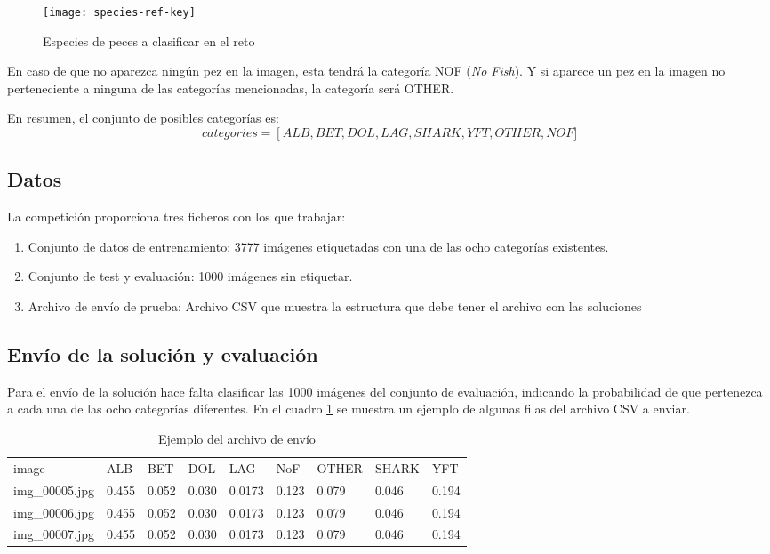 \begin{figure}
  \centering
  \caption{Especies de peces a clasificar en el reto}
\label{kaggle-fishes}
  \texttt{[image: species-ref-key]}
\end{figure}

En caso de que no aparezca ningún pez en la imagen, esta tendrá la categoría NOF (\textit{No Fish}). Y si aparece un pez en la imagen no perteneciente a ninguna de las categorías mencionadas, la categoría será OTHER.

En resumen, el conjunto de posibles categorías es:
\[
  categories =
  \left[ALB, BET, DOL, LAG, SHARK, YFT, OTHER, NOF]
\]

\subsection{Datos}

La competición proporciona tres ficheros con los que trabajar:

\begin{enumerate}
  \item{Conjunto de datos de entrenamiento: 3777 imágenes etiquetadas con una de las ocho categorías existentes.}
  \item{Conjunto de test y evaluación: 1000 imágenes sin etiquetar.}
  \item{Archivo de envío de prueba: Archivo CSV que muestra la estructura que debe tener el archivo con las soluciones}
\end{enumerate}

\subsection{Envío de la solución y evaluación}
\label{sec:envio-y-eval}

Para el envío de la solución hace falta clasificar las 1000 imágenes del conjunto de evaluación, indicando la probabilidad de que pertenezca a cada una de las ocho categorías diferentes. En el cuadro \ref{submission-sample} se muestra un ejemplo de algunas filas del archivo CSV a enviar.

\begin{table}[]
\centering
\caption{Ejemplo del archivo de envío}
\label{submission-sample}
\begin{tabular}{lllllllll}
image          & ALB   & BET   & DOL   & LAG    & NoF   & OTHER & SHARK  & YFT  \\
img\_00005.jpg & 0.455 & 0.052 & 0.030 & 0.0173 & 0.123 & 0.079 & 0.046 & 0.194\\
img\_00006.jpg & 0.455 & 0.052 & 0.030 & 0.0173 & 0.123 & 0.079 & 0.046 & 0.194\\
img\_00007.jpg & 0.455 & 0.052 & 0.030 & 0.0173 & 0.123 & 0.079 & 0.046 & 0.194\\
\end{tabular}
\end{table}

